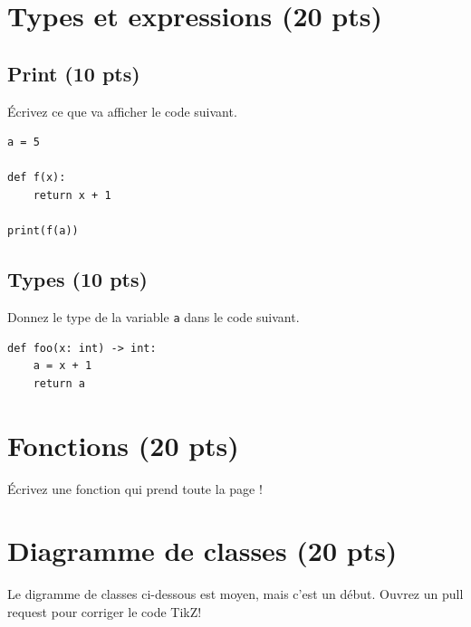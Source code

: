 \documentclass[letterpaper, 12pt]{article}
\begin{document}
\newpage

\setcounter{page}{2}
\pagestyle{fancy}
\fancyhf{}
\cfoot{\thepage}


\section{Types et expressions (20 pts)}

\subsection{Print (10 pts)}
Écrivez ce que va afficher le code suivant.

\begin{verbatim}
a = 5

def f(x):
    return x + 1

print(f(a))
\end{verbatim}

\vfill

\subsection{Types (10 pts)}
Donnez le type de la variable \texttt{a} dans le code suivant.
\begin{verbatim}
def foo(x: int) -> int:
    a = x + 1
    return a
\end{verbatim}

\vfill

\newpage

\section{Fonctions (20 pts)}

Écrivez une fonction qui prend toute la page !

\newpage

\section{Diagramme de classes (20 pts)}

Le digramme de classes ci-dessous est moyen, mais c'est un début.
Ouvrez un pull request pour corriger le code TikZ!
\end{document}
